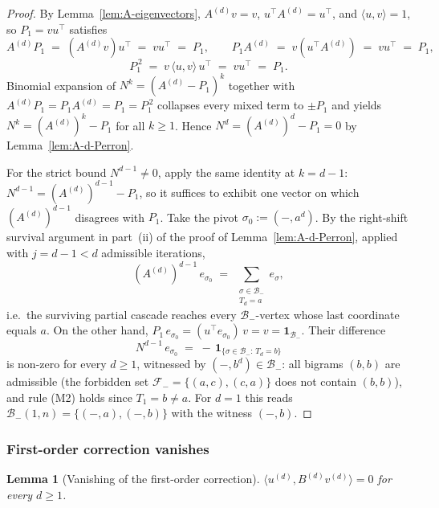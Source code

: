 \documentclass{amsart}
\newtheorem{lemma}[theorem]{Lemma}
\theoremstyle{definition}
\theoremstyle{remark}
\begin{document}
\begin{proof}
By Lemma~\ref{lem:A-eigenvectors}, $A^{(d)} v = v$,
$u^{\top} A^{(d)} = u^{\top}$, and $\langle u, v\rangle = 1$, so
$P_1 = v u^{\top}$ satisfies
\[
  A^{(d)} P_1 \;=\; (A^{(d)} v) u^{\top} \;=\; v u^{\top} \;=\; P_1,
  \qquad
  P_1 A^{(d)} \;=\; v (u^{\top} A^{(d)}) \;=\; v u^{\top} \;=\; P_1,
\]
\[
  P_1^{\,2} \;=\; v\,\langle u, v\rangle\, u^{\top}
  \;=\; v u^{\top} \;=\; P_1.
\]
Binomial expansion of $N^k = (A^{(d)} - P_1)^k$ together with
$A^{(d)} P_1 = P_1 A^{(d)} = P_1 = P_1^{\,2}$ collapses every
mixed term to $\pm P_1$ and yields
$N^k = (A^{(d)})^k - P_1$ for all $k \ge 1$.  Hence
$N^d = (A^{(d)})^d - P_1 = 0$ by Lemma~\ref{lem:A-d-Perron}.

For the strict bound $N^{d-1} \ne 0$, apply the same identity at
$k = d - 1$: $N^{d-1} = (A^{(d)})^{d-1} - P_1$, so it suffices to
exhibit one vector on which $(A^{(d)})^{d-1}$ disagrees with
$P_1$.  Take the pivot $\sigma_0 := (-, a^d)$.  By the
right-shift survival argument in part~(ii) of the proof of
Lemma~\ref{lem:A-d-Perron}, applied with $j = d - 1 < d$
admissible iterations,
\[
  (A^{(d)})^{d-1}\, e_{\sigma_0}
  \;=\; \sum_{\substack{\sigma \in \mathcal{B}_-\\ T_d = a}} e_\sigma,
\]
i.e.\ the surviving partial cascade reaches every
$\mathcal{B}_-$-vertex whose last coordinate equals $a$.  On the
other hand, $P_1\, e_{\sigma_0} = (u^{\top} e_{\sigma_0})\, v = v
= \mathbf{1}_{\mathcal{B}_-}$.  Their difference
\[
  N^{d-1}\, e_{\sigma_0}
  \;=\; -\,\mathbf{1}_{\{\sigma \in \mathcal{B}_- :\, T_d = b\}}
\]
is non-zero for every $d \ge 1$, witnessed by
$(-, b^d) \in \mathcal{B}_-$: all bigrams $(b, b)$ are admissible
(the forbidden set $\mathcal{F}_- = \{(a, c), (c, a)\}$ does not
contain $(b, b)$), and rule (M2) holds since $T_1 = b \ne a$.
For $d = 1$ this reads $\mathcal{B}_-(1, n) = \{(-, a), (-, b)\}$
with the witness $(-, b)$.
\end{proof}

\subsubsection{First-order correction vanishes}
\label{sec:first-order}

\begin{lemma}[Vanishing of the first-order correction]
\label{lem:first-order}
$\langle u^{(d)}, B^{(d)} v^{(d)} \rangle = 0$ for every $d \ge 1$.
\end{lemma}
\end{document}
